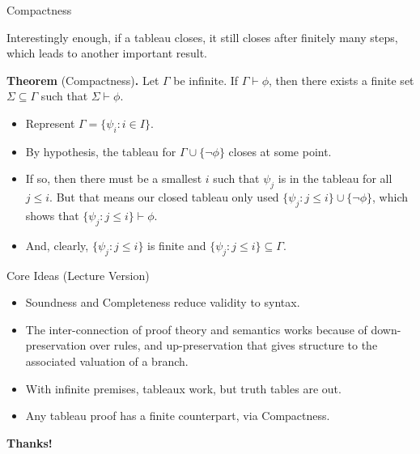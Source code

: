 \begin{frame}{Compactness}

Interestingly enough, if a tableau closes, it still closes after finitely many steps, which leads to another important result.

\bigskip

\textbf{Theorem} (Compactness)\textbf{.} Let $\Gamma$ be infinite. If $\Gamma\vdash\phi$, then there exists a finite set $\Sigma\subseteq\Gamma$ such that $\Sigma\vdash\phi$. 

\bigskip

\begin{itemize}
\itemsep=16pt

	
		\item Represent $\Gamma=\{\psi_i: i\in I\}$.
			
		\item By hypothesis, the tableau for $\Gamma\cup\{\neg\phi\}$ closes at some point.
		
		\item If so, then there must be a smallest $i$ such that $\psi_j$ is in the tableau for all $j\leq i$.
		But that means our closed tableau only used $\{\psi_j: j\leq i\}\cup\{\neg\phi\}$, which shows that $\{\psi_j: j\leq i\}\vdash\phi$.
				
		\item And, clearly, $\{\psi_j: j\leq i\}$ is finite and $\{\psi_j: j\leq i\}\subseteq\Gamma$.
	
	\end{itemize}


\end{frame}

\begin{frame}{Core Ideas (Lecture Version)}

\begin{itemize}
\itemsep=16pt

\item Soundness and Completeness reduce validity to syntax.
	
\item The inter-connection of proof theory and semantics works because of down-preservation over rules, and up-preservation that gives structure to the associated valuation of a branch.
	
\item With infinite premises, tableaux work, but truth tables are out.

\item Any tableau proof has a finite counterpart, via Compactness.

\end{itemize}

\end{frame}



\begin{frame}

	\begin{center}
	{\huge\bf Thanks!}
	\end{center}

\end{frame}
